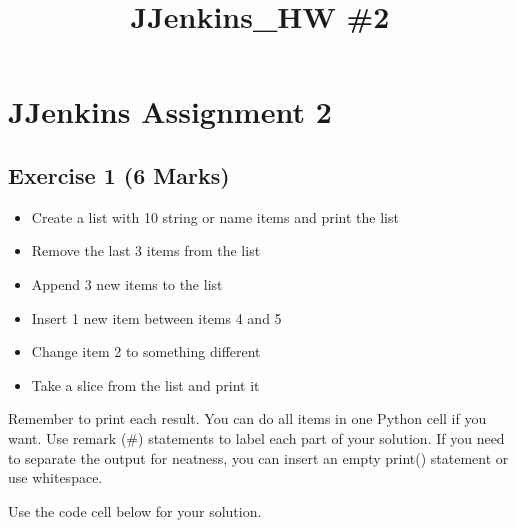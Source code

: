 \documentclass[11pt]{article}
\title{JJenkins\_HW \#2}
\providecommand{\tightlist}{%
      \setlength{\itemsep}{0pt}\setlength{\parskip}{0pt}}
\begin{document}
    
    
    \maketitle
    
    

    
    \hypertarget{jjenkins-assignment-2}{%
\section{JJenkins Assignment 2}\label{jjenkins-assignment-2}}

    \hypertarget{exercise-1-6-marks}{%
\subsection{Exercise 1 (6 Marks)}\label{exercise-1-6-marks}}

\begin{itemize}
\tightlist
\item
  Create a list with 10 string or name items and print the list
\item
  Remove the last 3 items from the list
\item
  Append 3 new items to the list
\item
  Insert 1 new item between items 4 and 5
\item
  Change item 2 to something different
\item
  Take a slice from the list and print it
\end{itemize}

Remember to print each result. You can do all items in one Python cell
if you want. Use remark (\#) statements to label each part of your
solution. If you need to separate the output for neatness, you can
insert an empty print() statement or use whitespace.

Use the code cell below for your solution.
\end{document}
